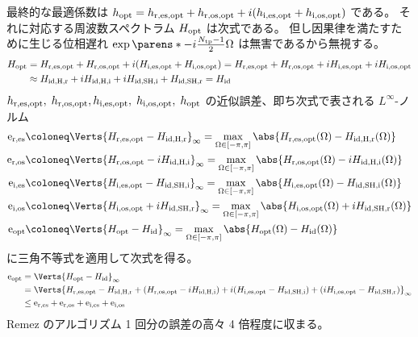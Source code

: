             最終的な最適係数は $h_{\text{opt}} = h_{\text{r,es,opt}} + h_{\text{r,os,opt}} + i(h_{\text{i,es,opt}} + h_{\text{i,os,opt}})$ である。
            それに対応する周波数スペクトラム $H_{\text{opt}}$ は次式である。
            但し因果律を満たすために生じる位相遅れ $\exp\parens*{-i\frac{\Ntp-1}{2}\Omega}$ は無害であるから無視する。
            \begin{align*}
                H_{\text{opt}} &= H_{\text{r,es,opt}} + H_{\text{r,os,opt}} + i(H_{\text{i,es,opt}} + H_{\text{i,os,opt}}) = H_{\text{r,es,opt}} + H_{\text{r,os,opt}} + iH_{\text{i,es,opt}} + iH_{\text{i,os,opt}} \\
                &\approx H_{\text{id,H,r}} + iH_{\text{id,H,i}} + iH_{\text{id,SH,i}} + H_{\text{id,SH,r}} = H_{\text{id}}
            \end{align*}
            $h_{\text{r,es,opt}},\;h_{\text{r,os,opt}},h_{\text{i,es,opt}},\;h_{\text{i,os,opt}},\;h_{\text{opt}}$ の近似誤差、即ち次式で表される $L^\infty$-ノルム
            \begin{align*}
                \erEs &\coloneq \Verts{\HrEsOpt - \HidHr}_\infty = \max_{\Omega\in[-\pi,\pi]}\abs{\HrEsOpt(\Omega) - \HidHr(\Omega)} \\
                \erOs &\coloneq \Verts{\HrOsOpt - i\HidHi}_\infty = \max_{\Omega\in[-\pi,\pi]}\abs{\HrOsOpt(\Omega) - i\HidHi(\Omega)} \\
                \eiEs &\coloneq \Verts{\HiEsOpt - \HidSHi}_\infty = \max_{\Omega\in[-\pi,\pi]}\abs{\HiEsOpt(\Omega) - \HidSHi(\Omega)} \\
                \eiOs &\coloneq \Verts{\HiOsOpt + i\HidSHr}_\infty = \max_{\Omega\in[-\pi,\pi]}\abs{\HiOsOpt(\Omega) + i\HidSHr(\Omega)} \\
                \eOpt &\coloneq \Verts{\Hopt - \Hid}_\infty = \max_{\Omega\in[-\pi,\pi]}\abs{\Hopt(\Omega ) -\Hid(\Omega)}
            \end{align*}
            に三角不等式を適用して次式を得る。
            \begin{align*}
                \eOpt &= \Verts{\Hopt - \Hid}_\infty \\
                &= \Verts{\HrEsOpt - \HidHr + (\HrOsOpt - i\HidHi) + i(\HiEsOpt - \HidSHi) + (i\HiOsOpt - \HidSHr)}_\infty \\
                &\leq \erEs + \erOs + \eiEs + \eiOs
            \end{align*}
            Remez のアルゴリズム 1 回分の誤差の高々 4 倍程度に収まる。

